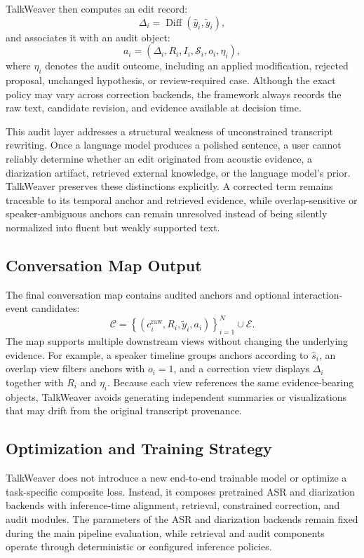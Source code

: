 \documentclass[10pt,twocolumn]{article}
\begin{document}
TalkWeaver then computes an edit record:
\[
\Delta_i
=
\operatorname{Diff}
\left(
\hat{y}_i,\tilde{y}_i
\right),
\]
and associates it with an audit object:
\[
a_i
=
\left(
\Delta_i,
R_i,
I_i,
\mathcal{S}_i,
o_i,
\eta_i
\right),
\]
where \(\eta_i\) denotes the audit outcome, including an applied modification, rejected proposal, unchanged hypothesis, or review-required case. Although the exact policy may vary across correction backends, the framework always records the raw text, candidate revision, and evidence available at decision time.

This audit layer addresses a structural weakness of unconstrained transcript rewriting. Once a language model produces a polished sentence, a user cannot reliably determine whether an edit originated from acoustic evidence, a diarization artifact, retrieved external knowledge, or the language model's prior. TalkWeaver preserves these distinctions explicitly. A corrected term remains traceable to its temporal anchor and retrieved evidence, while overlap-sensitive or speaker-ambiguous anchors can remain unresolved instead of being silently normalized into fluent but weakly supported text.

\subsection{Conversation Map Output}

The final conversation map contains audited anchors and optional interaction-event candidates:
\[
\mathcal{C}
=
\left\{
\left(
c_i^{\mathrm{raw}},
R_i,
\tilde{y}_i,
a_i
\right)
\right\}_{i=1}^{N}
\cup
\mathcal{E}.
\]
The map supports multiple downstream views without changing the underlying evidence. For example, a speaker timeline groups anchors according to \(\hat{s}_i\), an overlap view filters anchors with \(o_i=1\), and a correction view displays \(\Delta_i\) together with \(R_i\) and \(\eta_i\). Because each view references the same evidence-bearing objects, TalkWeaver avoids generating independent summaries or visualizations that may drift from the original transcript provenance.

\subsection{Optimization and Training Strategy}

TalkWeaver does not introduce a new end-to-end trainable model or optimize a task-specific composite loss. Instead, it composes pretrained ASR and diarization backends with inference-time alignment, retrieval, constrained correction, and audit modules. The parameters of the ASR and diarization backends remain fixed during the main pipeline evaluation, while retrieval and audit components operate through deterministic or configured inference policies.
\end{document}
